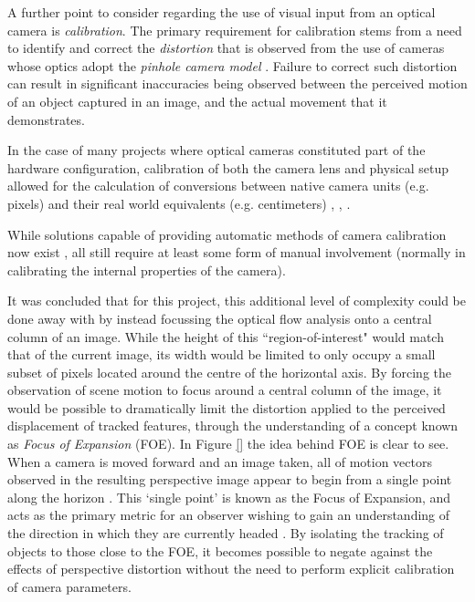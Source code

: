 A further point to consider regarding the use of visual input from an optical camera is \textit{calibration}. The primary requirement for calibration stems from a need to identify and correct the \textit{distortion} that is observed from the use of cameras whose optics adopt the \textit{pinhole camera model} \cite{camera-calib}. Failure to correct such distortion can result in significant inaccuracies being observed between the perceived motion of an object captured in an image, and the actual movement that it demonstrates. 

In the case of many projects where optical cameras constituted part of the hardware configuration, calibration of both the camera lens and physical setup allowed for the calculation of conversions between native camera units (e.g. pixels) and their real world equivalents (e.g. centimeters) \cite{campbell}, \cite{low}, \cite{}.

While solutions capable of providing automatic methods of camera calibration now exist \cite{camera-calib}, all still require at least some form of manual involvement (normally in calibrating the internal properties of the camera). 

It was concluded that for this project, this additional level of complexity could be done away with by instead focussing the optical flow analysis onto a central column of an image. While the height of this ``region-of-interest" would match that of the current image, its width would be limited to only occupy a small subset of pixels located around the centre of the horizontal axis. By forcing the observation of scene motion to focus around a central column of the image, it would be possible to dramatically limit the distortion applied to the perceived displacement of tracked features, through the understanding of a concept known as \textit{Focus of Expansion} (FOE). In Figure \ref{} the idea behind FOE is clear to see. When a camera is moved forward and an image taken, all of motion vectors observed in the resulting perspective image appear to begin from a single point along the horizon \cite{stanford-cs}. This `single point' is known as the Focus of Expansion, and acts as the primary metric for an observer wishing to gain an understanding of the direction in which they are currently headed \cite{texas-cs}. By isolating the tracking of objects to those close to the FOE, it becomes possible to negate against the effects of perspective distortion without the need to perform explicit calibration of camera parameters. 





